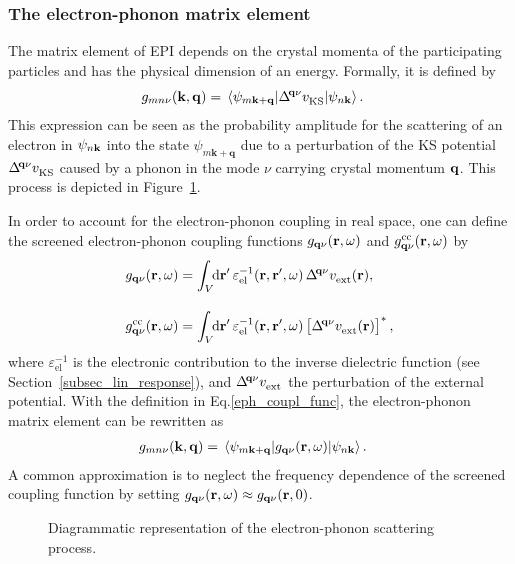 \subsubsection{The electron-phonon matrix element}
The matrix element of EPI depends on the crystal momenta of the participating particles and has the physical dimension of an energy. Formally, it is defined by 
%
\begin{align}\label{g_formal}
    g_{mn\nu}(\mathbf{k,q}) &  =\mel{\psi_{m\mathbf{k+q}}}{\Delta^{\!\mathbf{q}\nu}v_\text{KS}^{\phantom{I}}}{\psi_{n\mathbf{k}}}.
\end{align}
%
This expression can be seen as the probability amplitude for the scattering of an electron in  $\psi_{n\mathbf{k}}$ into the state $\psi_{m\mathbf{k+q}}$ due to a perturbation of the KS potential $\Delta^{\!\mathbf{q}\nu}v_\text{KS}^{\phantom{I}}$ caused by a phonon in the mode $\nu$ carrying crystal momentum $\mathbf{q}$. This process is depicted in Figure~\ref{mel_elph}.\par
\newpage
In order to account for the electron-phonon coupling in real space, one can define the
 screened electron-phonon coupling functions $g_{\mathbf{q}\nu}(\mathbf{r},\omega)$ and $g^\text{cc}_{\mathbf{q}\nu}(\mathbf{r},\omega)$ by
%
\begin{align}
         g_{\mathbf{q}\nu}(\mathbf{r},\omega) & = \int_V\text{\!\!d}\mathbf{r}' \,\varepsilon_\text{el}^{-1}(\mathbf{r},\mathbf{r}',\omega)\,\Delta^{\!\mathbf{q}\nu}v_\text{ext}^{\phantom{I}}(\mathbf{r}),\label{eph_coupl_func}\\[10pt]
         g^\text{cc}_{\mathbf{q}\nu}(\mathbf{r},\omega) & = \int_V\text{\!\!d}\mathbf{r}' \,\varepsilon_\text{el}^{-1}(\mathbf{r},\mathbf{r}',\omega)\left[\Delta^{\!\mathbf{q}\nu}v_\text{ext}^{\phantom{I}}(\mathbf{r})\right]^*\label{eph_coupl_func_cc}, 
\end{align}
%
where $\varepsilon_\text{el}^{-1}$ is the electronic contribution to the inverse dielectric function (see Section~\ref{subsec_lin_response}), and $\Delta^{\!\mathbf{q}\nu}v_\text{ext}^{\phantom{I}}$ the perturbation of the external potential. With the definition in Eq.\;\eqref{eph_coupl_func}, the electron-phonon matrix element can be rewritten as\cite{Giustino}
%
%
\begin{align}\label{g_coupl_func}
    g_{mn\nu}(\mathbf{k,q}) &  =\mel{\psi_{m\mathbf{k+q}}}{ g_{\mathbf{q}\nu}(\mathbf{r},\omega)}{\psi_{n\mathbf{k}}}.
\end{align}
%
A common approximation is to  neglect the frequency dependence of the screened coupling function by setting $g_{\mathbf{q}\nu}(\mathbf{r},\omega)\approx g_{\mathbf{q}\nu}(\mathbf{r},0)$.
\begin{figure}[t]
\centering
{}
\caption{Diagrammatic representation of the electron-phonon scattering process.}
\label{mel_elph}
\end{figure}
